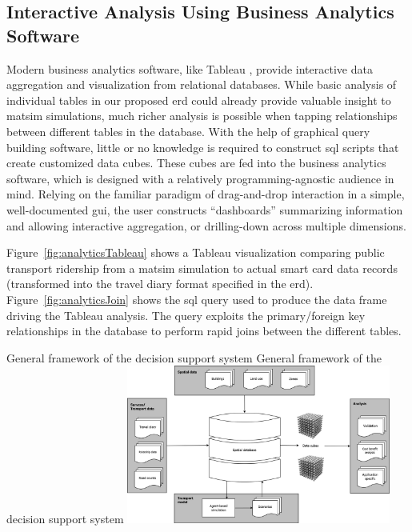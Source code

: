 \subsection{Interactive Analysis Using Business Analytics Software}
Modern business analytics software, like Tableau \citep{Tableau_Webpage_2013}, provide interactive data aggregation and visualization from relational databases. While basic analysis of individual tables in our proposed \gls{erd} could already provide valuable insight to \gls{matsim} simulations, much richer analysis is possible when tapping relationships between different tables in the database. With the help of graphical query building software, little or no knowledge is required to construct \gls{sql} scripts that create customized data cubes. These cubes are fed into the business analytics software, which is designed with a relatively programming-agnostic audience in mind. Relying on the familiar paradigm of drag-and-drop interaction in a simple, well-documented \gls{gui}, the user constructs ``dashboards'' summarizing information and allowing interactive aggregation, or drilling-down across multiple dimensions.

Figure~\ref{fig:analyticsTableau} shows a Tableau visualization comparing public transport ridership from a \gls{matsim} simulation to actual smart card data records (transformed into the travel diary format specified in the \gls{erd}). Figure~\ref{fig:analyticsJoin} shows the \gls{sql} query used to produce the data frame driving the Tableau analysis. The query exploits the primary/foreign key relationships in the database to perform rapid joins between the different tables.

\createfigure%
{General framework of the decision support system}%
{General framework of the decision support system}%
{\label{fig:analyticsFramework}}%
{\includegraphics[width=0.65\textwidth, angle=0]{extending/figures/businessanalytics/general}}%
{}

